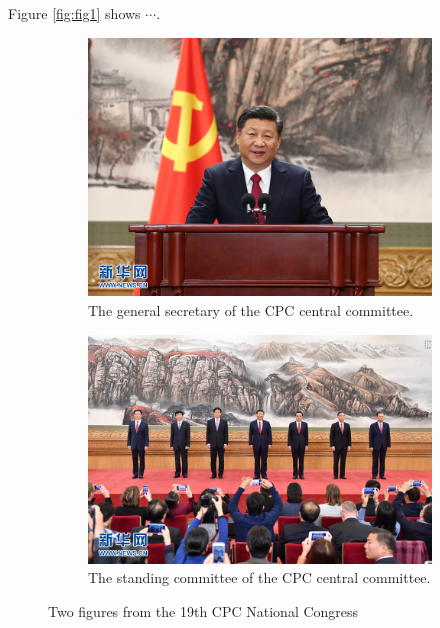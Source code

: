 \documentclass[a4paper,11pt]{article}
\begin{document}
Figure \ref{fig:fig1} shows $\cdots$.

\begin{figure}[h!]
  \centering
  \begin{subfigure}[b]{0.5\linewidth}
    \includegraphics[width=\linewidth]{./figures/19-1.jpg}
    \caption{The general secretary of the CPC central committee.}
  \end{subfigure}
  \begin{subfigure}[b]{0.5\linewidth}
    \includegraphics[width=\linewidth]{./figures/19-2.jpg}
    \caption{The standing committee of the CPC central committee.}
  \end{subfigure}
  \caption{Two figures from the 19th CPC National Congress}
  \label{fig:fig2}
\end{figure}
\end{document}
